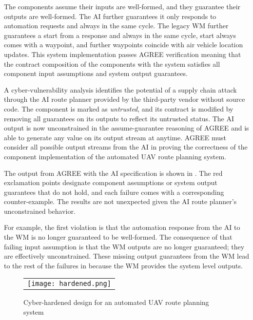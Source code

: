 The components assume their inputs are well-formed, and they guarantee their outputs are well-formed.
The AI further guarantees it only responds to automation requests and always in the same cycle.
The legacy WM further guarantees a start from a response and always in the same cycle, start always comes with a waypoint, and further waypoints coincide with air vehicle location updates.
This system implementation passes AGREE verification meaning that the contract composition of the components with the system satisfies all component input assumptions and system output guarantees.

A cyber-vulnerability analysis identifies the potential of a supply chain attack through the AI route planner provided by the third-party vendor without source code.
The component is marked as \emph{untrusted}, and its contract is modified by removing all guarantees on its outputs to reflect its untrusted status.
The AI output is now unconstrained in the assume-guarantee reasoning of AGREE and is able to generate any value on its output stream at anytime.
AGREE must consider all possible output streams from the AI in proving the correctness of the component implementation of the automated UAV route planning system.

The output from AGREE with the AI specification is shown in .
The red exclamation points designate component assumptions or system output guarantees that do not hold, and each failure comes with a corresponding counter-example.
The results are not unexpected given the AI route planner's unconstrained behavior.

For example, the first violation is that the automation response from the AI to the WM is no longer guaranteed to be well-formed.
The consequence of that failing input assumption is that the WM outputs are no longer guaranteed; they are effectively unconstrained.
These missing output guarantees from the WM lead to the rest of the failures in  because the WM provides the system level outputs.

\begin{figure*}
  \begin{center}
    \begin{tabular}{c}
      \texttt{[image: hardened.png]}
    \end{tabular}
  \end{center}
  \caption{Cyber-hardened design for an automated UAV route planning system}
  \label{fig:hardened}
\end{figure*}

